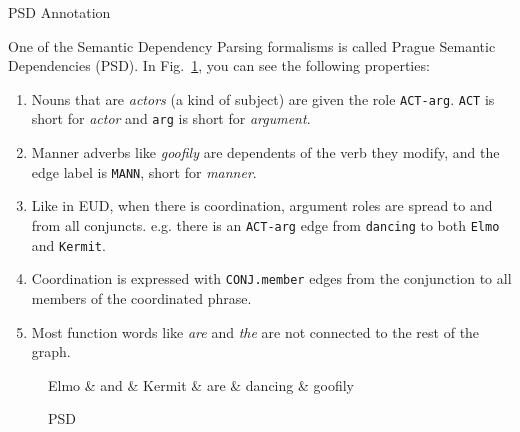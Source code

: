 \documentclass[addpoints
]{exam}
\theoremstyle{definition}
\newcommand{\handin}{\textcolor{red}{\textbf{Hand this in}}}
\begin{document}
\begin{questions}
\question PSD Annotation

  One of the Semantic Dependency Parsing formalisms is called Prague Semantic Dependencies (PSD). In Fig.~\ref{fig:psd}, you can see the following properties:

  \begin{enumerate}
  \item Nouns that are \textit{actors} (a kind of subject) are given the role \texttt{ACT-arg}. \texttt{ACT} is short for \textit{actor} and \texttt{arg} is short for \textit{argument}.
  \item Manner adverbs like \textit{goofily} are dependents of the verb they modify, and the edge label is \texttt{MANN}, short for \textit{manner}.
    
  \item Like in EUD, when there is coordination, argument roles are spread to and from all conjuncts. e.g. there is an \texttt{ACT-arg} edge from \texttt{dancing} to both \texttt{Elmo} and \texttt{Kermit}.
  \item Coordination is expressed with \texttt{CONJ.member} edges from the conjunction to all members of the coordinated phrase.
  \item Most function words like \textit{are} and \textit{the} are not connected to the rest of the graph.
  \end{enumerate}

  \begin{figure}[htbp]
    \centering
    \begin{dependency}
      \begin{deptext}[column sep=1.2cm]
        Elmo \& and \& Kermit \& are \& dancing \& goofily \\
      \end{deptext}
    \end{dependency}
    
    \caption{PSD}
    \label{fig:psd}
  \end{figure}

\end{questions}
\end{document}
